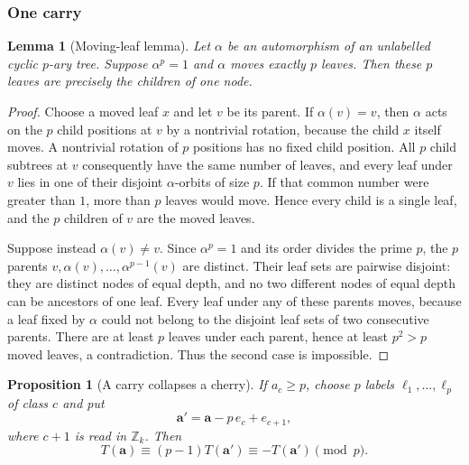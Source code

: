 \documentclass[11pt]{article}
\newtheorem{lemma}[theorem]{Lemma}
\newtheorem{proposition}[theorem]{Proposition}
\theoremstyle{definition}
\theoremstyle{remark}
\numberwithin{equation}{section}
\numberwithin{figure}{section}
\newcommand{\Z}{\mathbb Z}
\begin{document}
\subsubsection{One carry}
\begin{lemma}[Moving-leaf lemma]\label{main:lem:moving-leaves}
Let $\alpha$ be an automorphism of an unlabelled cyclic $p$-ary tree.  Suppose $\alpha^p=1$ and $\alpha$ moves exactly $p$ leaves.  Then these $p$ leaves are precisely the children of one node.
\end{lemma}
\begin{proof}
Choose a moved leaf $x$ and let $v$ be its parent.  If $\alpha(v)=v$, then $\alpha$ acts on the $p$ child positions at $v$ by a nontrivial rotation, because the child $x$ itself moves.  A nontrivial rotation of $p$ positions has no fixed child position.  All $p$ child subtrees at $v$ consequently have the same number of leaves, and every leaf under $v$ lies in one of their disjoint $\alpha$-orbits of size $p$.  If that common number were greater than $1$, more than $p$ leaves would move.  Hence every child is a single leaf, and the $p$ children of $v$ are the moved leaves.

Suppose instead $\alpha(v)\ne v$.  Since $\alpha^p=1$ and its order divides the prime $p$, the $p$ parents $v,\alpha(v),\ldots,\alpha^{p-1}(v)$ are distinct.  Their leaf sets are pairwise disjoint: they are distinct nodes of equal depth, and no two different nodes of equal depth can be ancestors of one leaf.  Every leaf under any of these parents moves, because a leaf fixed by $\alpha$ could not belong to the disjoint leaf sets of two consecutive parents.  There are at least $p$ leaves under each parent, hence at least $p^2>p$ moved leaves, a contradiction.  Thus the second case is impossible.
\end{proof}
\begin{proposition}[A carry collapses a cherry]\label{main:prop:carry}
If $a_c\ge p$, choose $p$ labels $\ell_1,\ldots,\ell_p$ of class $c$ and put
\[
 \mathbf a'=\mathbf a-p\,e_c+e_{c+1},
\]
where $c+1$ is read in $\Z_k$.  Then
\[
 T(\mathbf a)\equiv(p-1)T(\mathbf a')
 \equiv-T(\mathbf a')\pmod p.
\]
\end{proposition}
\end{document}
